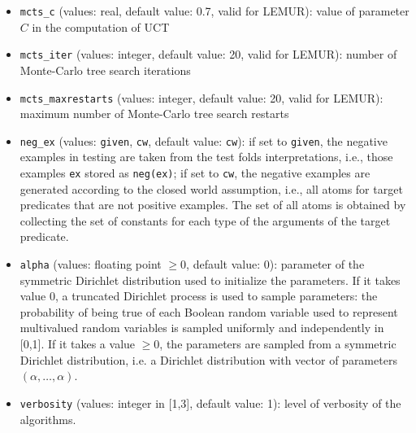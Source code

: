 \begin{itemize}
\item \verb|mcts_c|  (values: real, default value: 0.7, valid for LEMUR): value of parameter $C$ in the computation of UCT
\item \verb|mcts_iter|  (values: integer, default value: 20, valid for LEMUR): number of Monte-Carlo tree search iterations
\item \verb|mcts_maxrestarts|  (values: integer, default value: 20, valid for LEMUR): maximum number of Monte-Carlo tree search restarts
\item \verb|neg_ex| (values:  \verb|given|, \verb|cw|, default value: \verb|cw|): if  set to \verb|given|, the negative examples in testing
are taken from the test folds interpretations, i.e., those examples \verb|ex| stored as \verb|neg(ex)|; if set to \verb|cw|, the negative examples are generated according to the closed world assumption, i.e., all atoms for target predicates that are not positive examples. The set of all atoms is obtained by collecting the set of constants for each type of the arguments of the target predicate.
\item \verb|alpha| (values: floating point $\geq 0$, default value: 0): parameter of the 
symmetric Dirichlet distribution used to initialize the parameters. If it takes value 0, a truncated Dirichlet process is
used to sample parameters: the probability of being true of  each Boolean random variable 
used to represent multivalued
random variables is sampled uniformly and independently in [0,1]. If it takes a value $\geq 0$, the parameters are sampled from
a symmetric Dirichlet distribution, i.e. a Dirichlet distribution  with vector of parameters $(\alpha,\ldots,\alpha)$.
\item \verb|verbosity| (values: integer in [1,3], default value: 1): level of verbosity of the algorithms.
\end{itemize}
